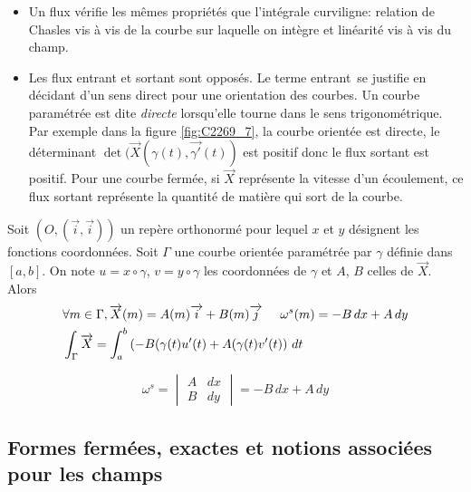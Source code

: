 \begin{rems}
 \begin{itemize}
  \item Un flux vérifie les mêmes propriétés que l'intégrale curviligne: relation de Chasles vis à vis de la courbe sur laquelle on intègre et linéarité vis à vis du champ.
  \item  Les flux entrant et sortant sont opposés. Le terme \og entrant\fg\, se justifie en décidant d'un sens direct pour une orientation des courbes. Un courbe paramétrée est dite \emph{directe} lorsqu'elle tourne dans le sens trigonométrique. Par exemple dans la figure \ref{fig:C2269_7}, la courbe orientée est directe, le déterminant $\det(\overrightarrow{X}(\gamma(t),\overrightarrow{\gamma'}(t))$ est positif donc le flux sortant est positif. Pour une courbe fermée, si $\overrightarrow X$ représente la vitesse d'un écoulement, ce flux sortant représente la quantité de matière qui sort de la courbe. 
 \end{itemize}
\end{rems}
\begin{prop}
 Soit $(O,(\overrightarrow{i},\overrightarrow{i}))$ un repère orthonormé pour lequel $x$ et $y$ désignent les fonctions coordonnées. Soit $\Gamma$ une courbe orientée paramétrée par $\gamma$ définie dans $[a,b]$. On note $u=x\circ \gamma$, $v=y\circ \gamma$ les coordonnées de $\gamma$ et $A$, $B$ celles de $\overrightarrow X$. Alors
\begin{align*}
 &\forall m\in \Gamma, \overrightarrow X(m) = A(m)\overrightarrow i + B(m)\overrightarrow j\hspace{0.5cm}
\omega^s(m) = -B\,dx + A\,dy \\
& \int_\Gamma \overrightarrow X = \int_a^b \left(-B(\gamma(t)u'(t)+ A(\gamma(t)v'(t) \right)\,dt  
\end{align*}
\end{prop}
\begin{demo}
 \begin{displaymath}
  \omega^s = 
\begin{vmatrix}
 A & dx \\ B & dy
\end{vmatrix}
= -B\,dx + A\,dy
 \end{displaymath}
\end{demo}

\subsection{Formes fermées, exactes et notions associées pour les champs}
